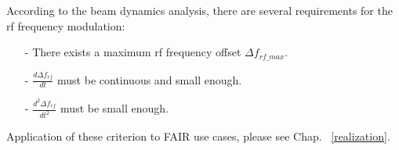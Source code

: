 According to the beam dynamics analysis, there are several requirements for the rf frequency modulation: 
\begin{itemize}
\item[-]
There exists a maximum rf frequency offset $\Delta f_\mathit{rf\_max}$. 
\item[-]
$\frac{d\Delta f_{\mathit{rf}}}{dt}$ must be continuous and small enough. 
\item[-]
$\frac{d^2\Delta f_{\mathit{rf}}}{dt^2}$ must be small enough. 
\end{itemize}
Application of these criterion to FAIR use cases, please see Chap. ~\ref{realization}.
%
%
%
%
%
%
%
%


